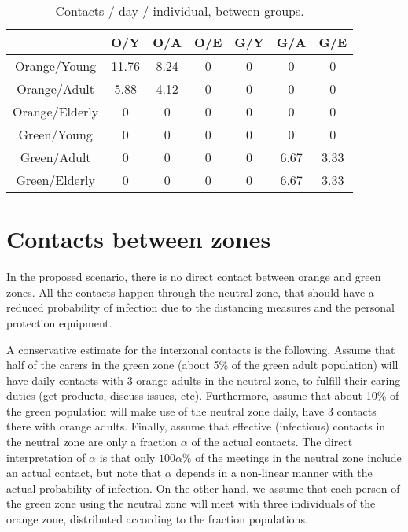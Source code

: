 \documentclass{article}
\begin{document}
\begin{table}[h!]
\begin{center}
\begin{tabular}{|c|c|c|c|c|c|c| } 
 \hline
               & O/Y & O/A & O/E & G/Y & G/A & G/E \\ 
\hline
Orange/Young   & 11.76        & 8.24         & 0              & 0           & 0           & 0 \\ 
\hline
Orange/Adult   & 5.88         & 4.12         & 0              & 0           & 0           & 0 \\ 
\hline
Orange/Elderly & 0            & 0            & 0              & 0           & 0           & 0 \\ 
\hline
Green/Young    & 0            & 0            & 0              & 0           & 0           & 0 \\ 
\hline
Green/Adult    & 0            & 0            & 0              & 0           & 6.67        & 3.33 \\ 
\hline
Green/Elderly  & 0            & 0            & 0              & 0           & 6.67        & 3.33 \\ 
\hline
\end{tabular}
\caption{Contacts / day / individual, between groups.}
\label{tab:contact_groups}
\end{center}
\end{table}

\section{Contacts between zones}

In the proposed scenario, there is no direct contact between orange and green
zones. All the contacts happen through the neutral zone, that should have a
reduced probability of infection due to the distancing measures and the
personal protection equipment.

A conservative estimate for the interzonal contacts is the following. Assume
that half of the carers in the green zone (about 5\% of the green adult
population) will have daily contacts with 3 orange adults in the neutral zone,
to fulfill their caring duties (get products, discuss issues, etc).
Furthermore, assume that about 10\% of the green population will make use of
the neutral zone daily, have 3 contacts there with orange adults. Finally,
assume that effective (infectious) contacts in the neutral zone are only a fraction $\alpha$ of the
actual contacts. The direct interpretation of $\alpha$ is that only
$100\alpha\%$ of the meetings in the neutral zone include an actual contact,
but note that $\alpha$ depends in a non-linear manner with the
actual probability of infection. On the other hand, we assume that each person
of the green zone using the neutral zone will meet with three individuals of
the orange zone, distributed according to the fraction populations.
\end{document}

